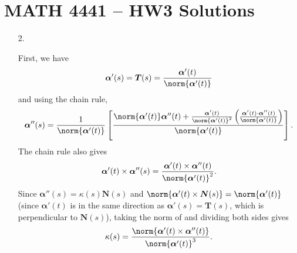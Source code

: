 \documentclass[a4paper,12pt]{article}
\newcommand{\bs}{\boldsymbol}
\theoremstyle{remark}
\begin{document}
\section*{MATH 4441 -- HW3 Solutions}
\begin{enumerate}
    \item[2.]
        \iffalse
            We know that the formula for a curve in any number of dimensions is given by
            \begin{align*}
                \kappa(t) &= \norm*{\left( \frac{\bs{\alpha}'(t)}{\norm{\bs{\alpha}'(t)}} \right)' \frac{1}{\norm{\bs{\alpha}'(t)}}} \\
                &= \norm*{\left( \frac{\norm{\bs{\alpha}'(t)} \bs{\alpha}''(t) - \bs{\alpha}'(t) \norm{\bs{\alpha}'(t)}'}{\norm{\bs{\alpha}'(t)}^2} \right) \frac{1}{\norm{\bs{\alpha}'(t)}}} \\
                &= \frac{\norm*{\norm{\bs{\alpha}'(t)} \bs{\alpha}''(t) - \bs{\alpha}'(t) \norm{\bs{\alpha}'(t)}'}}{\norm{\bs{\alpha}'(t)}^3}
            \end{align*}
            What remains to be shown is that the numerator becomes $\norm{\bs{\alpha}'(t) \times \bs{\alpha}''(t)}$ in 3 dimensions:
            \begin{align*}
            \end{align*}
        \fi
        First, we have
        \begin{align*}
            \bs{\alpha}'(s) = \bs{T}(s) = \frac{\bs{\alpha}'(t)}{\norm{\bs{\alpha}'(t)}}
        \end{align*}
        and using the chain rule,
        \begin{align*}
            \bs{\alpha}''(s) = \frac{1}{\norm{\bs{\alpha}'(t)}} \left[ \frac{\norm{\bs{\alpha}'(t)} \bs{\alpha}''(t) + \frac{\bs{\alpha}'(t)}{\norm{\bs{\alpha}'(t)}^2} \left( \frac{\bs{\alpha}'(t) \cdot \bs{\alpha}''(t)}{\norm{\bs{\alpha}'(t)}} \right)}{\norm{\bs{\alpha}'(t)}} \right].
        \end{align*}
        The chain rule also gives
        \begin{align*}
            \bs{\alpha}'(t) \times \bs{\alpha}''(s) = \frac{\bs{\alpha}'(t) \times \bs{\alpha}''(t)}{\norm{\bs{\alpha}'(t)}^2}.
        \end{align*}
        Since $\bs{\alpha}''(s) = \kappa(s) \bs{N}(s)$ and $\norm{\bs{\alpha}'(t) \times \bs{N}(s)} = \norm{\bs{\alpha}'(t)}$ (since $\bs{\alpha}'(t)$ is in the same direction as $\bs{\alpha}'(s) = \bs{T}(s)$, which is perpendicular to $\bs{N}(s)$), taking the norm of and dividing both sides gives
        \begin{align*}
            \kappa(s) = \frac{\norm{\bs{\alpha}'(t) \times \bs{\alpha}''(t)}}{\norm{\bs{\alpha}'(t)}^3}.
        \end{align*}


\end{enumerate}
\end{document}
